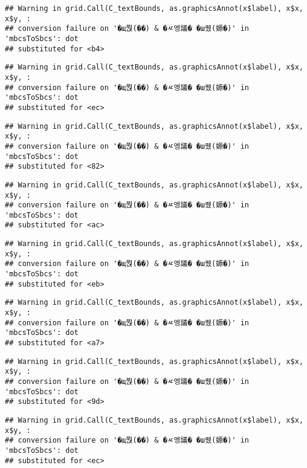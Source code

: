 \documentclass[
]{article}
\begin{document}
\begin{verbatim}
## Warning in grid.Call(C_textBounds, as.graphicsAnnot(x$label), x$x, x$y, :
## conversion failure on '�щ쭩(��) & �ㅼ엥議� �ш퀬(嫄�)' in 'mbcsToSbcs': dot
## substituted for <b4>
\end{verbatim}

\begin{verbatim}
## Warning in grid.Call(C_textBounds, as.graphicsAnnot(x$label), x$x, x$y, :
## conversion failure on '�щ쭩(��) & �ㅼ엥議� �ш퀬(嫄�)' in 'mbcsToSbcs': dot
## substituted for <ec>
\end{verbatim}

\begin{verbatim}
## Warning in grid.Call(C_textBounds, as.graphicsAnnot(x$label), x$x, x$y, :
## conversion failure on '�щ쭩(��) & �ㅼ엥議� �ш퀬(嫄�)' in 'mbcsToSbcs': dot
## substituted for <82>
\end{verbatim}

\begin{verbatim}
## Warning in grid.Call(C_textBounds, as.graphicsAnnot(x$label), x$x, x$y, :
## conversion failure on '�щ쭩(��) & �ㅼ엥議� �ш퀬(嫄�)' in 'mbcsToSbcs': dot
## substituted for <ac>
\end{verbatim}

\begin{verbatim}
## Warning in grid.Call(C_textBounds, as.graphicsAnnot(x$label), x$x, x$y, :
## conversion failure on '�щ쭩(��) & �ㅼ엥議� �ш퀬(嫄�)' in 'mbcsToSbcs': dot
## substituted for <eb>
\end{verbatim}

\begin{verbatim}
## Warning in grid.Call(C_textBounds, as.graphicsAnnot(x$label), x$x, x$y, :
## conversion failure on '�щ쭩(��) & �ㅼ엥議� �ш퀬(嫄�)' in 'mbcsToSbcs': dot
## substituted for <a7>
\end{verbatim}

\begin{verbatim}
## Warning in grid.Call(C_textBounds, as.graphicsAnnot(x$label), x$x, x$y, :
## conversion failure on '�щ쭩(��) & �ㅼ엥議� �ш퀬(嫄�)' in 'mbcsToSbcs': dot
## substituted for <9d>
\end{verbatim}

\begin{verbatim}
## Warning in grid.Call(C_textBounds, as.graphicsAnnot(x$label), x$x, x$y, :
## conversion failure on '�щ쭩(��) & �ㅼ엥議� �ш퀬(嫄�)' in 'mbcsToSbcs': dot
## substituted for <ec>
\end{verbatim}
\end{document}
